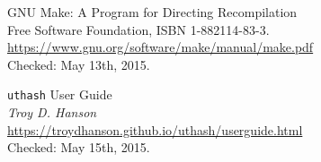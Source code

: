 \begin{thebibliography}{99}
		GNU Make: A Program for Directing Recompilation \\
		Free Software Foundation, ISBN 1-882114-83-3. \\
		\url{https://www.gnu.org/software/make/manual/make.pdf} \\
		Checked: May 13th, 2015.

		\verb|uthash| User Guide \\
		\emph{Troy D. Hanson} \\
		\url{https://troydhanson.github.io/uthash/userguide.html} \\
		Checked: May 15th, 2015.

\end{thebibliography}

